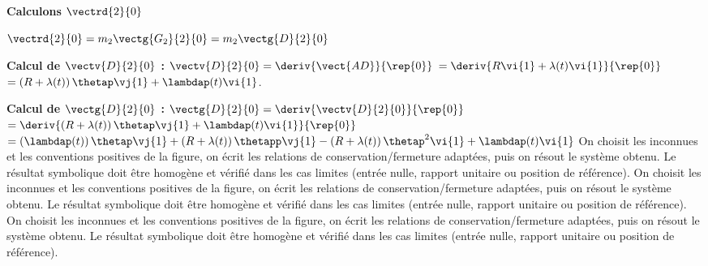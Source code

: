 \begin{corrigebox}
\textbf{Calculons $\vectrd{2}{0}$}

$\vectrd{2}{0} = m_2\vectg{G_2}{2}{0}=m_2 \vectg{D}{2}{0} $

 \textbf{Calcul de $\vectv{D}{2}{0}$ : }  
$\vectv{D}{2}{0}=\deriv{\vect{AD}}{\rep{0}}$ 
$=\deriv{ R\vi{1} + \lambda (t) \vi{1}}{\rep{0}}$  
$= \left( R + \lambda (t)\right) \thetap \vj{1} + \lambdap (t) \vi{1}$.

 \textbf{Calcul de $\vectg{D}{2}{0}$ : }  
$\vectg{D}{2}{0}=\deriv{\vectv{D}{2}{0}}{\rep{0}}$ 
$=\deriv{  \left( R + \lambda (t)\right) \thetap \vj{1} + \lambdap (t) \vi{1}}{\rep{0}}$  
$= \left(\lambdap (t)\right) \thetap \vj{1} +\left( R + \lambda (t)\right) \thetapp \vj{1} - \left( R + \lambda (t)\right) \thetap^2 \vi{1} + \lambdap (t) \vi{1}$
On choisit les inconnues et les conventions positives de la figure,
        on écrit les relations de conservation/fermeture adaptées, puis on résout le
        système obtenu. Le résultat symbolique doit être homogène et vérifié dans les cas
        limites (entrée nulle, rapport unitaire ou position de référence).
On choisit les inconnues et les conventions positives de la figure,
        on écrit les relations de conservation/fermeture adaptées, puis on résout le
        système obtenu. Le résultat symbolique doit être homogène et vérifié dans les cas
        limites (entrée nulle, rapport unitaire ou position de référence).
On choisit les inconnues et les conventions positives de la figure,
        on écrit les relations de conservation/fermeture adaptées, puis on résout le
        système obtenu. Le résultat symbolique doit être homogène et vérifié dans les cas
        limites (entrée nulle, rapport unitaire ou position de référence).
\end{corrigebox}
